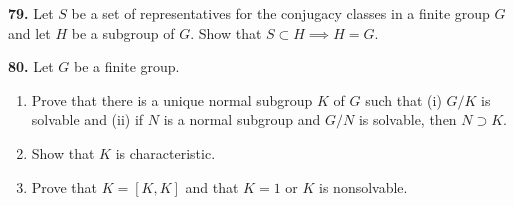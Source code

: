 \documentclass[a4paper,11pt,final,openany]{memoir}%
\theoremstyle{nonumberplain}
\begin{document}
\medskip\noindent\textbf{79.} Let $S$ be a set of representatives for the
conjugacy classes in a finite group $G$ and let $H$ be a subgroup of $G$. Show
that $S\subset H\implies H=G$.

\medskip\noindent\textbf{80.} Let $G$ be a finite group.

\begin{enumerate}
\item Prove that there is a unique normal subgroup $K$ of $G$ such that (i)
$G/K$ is solvable and (ii) if $N$ is a normal subgroup and $G/N$ is solvable,
then $N\supset K$.

\item Show that $K$ is characteristic.

\item Prove that $K=[K,K]$ and that $K=1$ or $K$ is nonsolvable.
\end{enumerate}
\end{document}
